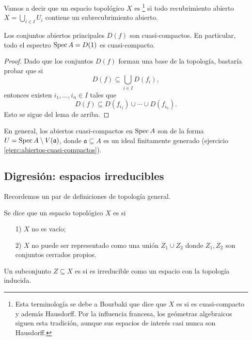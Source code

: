 \documentclass{article}
\numberwithin{equation}{section}
\theoremstyle{definition}
\begin{document}
Vamos a decir que un espacio topológico $X$ es
\footnote{Esta terminología se debe a Bourbaki que dice que
  $X$ es  si es cuasi-compacto y además Hausdorff. Por la
  influencia francesa, los geómetras algebraicos siguen esta tradición, aunque
  sus espacios de interés casi nunca son Hausdorff.} si todo recubrimiento
abierto $X = \bigcup_{i \in I} U_i$ contiene un subrecubrimiento abierto.

\begin{proposicion}
  \label{prof:Df-cuasi-compacto}
  Los conjuntos abiertos principales $D (f)$ son cuasi-compactos. En particular,
  todo el espectro $\operatorname{Spec} A = D (1)$ es cuasi-compacto.

  \begin{proof}
    Dado que los conjuntos $D (f)$ forman una base de la topología, bastaría
    probar que si
    $$D (f) \subseteq \bigcup_{i\in I} D (f_i),$$
    entonces existen $i_1,\ldots,i_n\in I$ tales que
    $$D (f) \subseteq D (f_{i_1}) \cup \cdots \cup D (f_{i_n}).$$
    Esto se sigue del lema de arriba.
  \end{proof}
\end{proposicion}

En general, los abiertos cuasi-compactos en $\operatorname{Spec} A$ son de la forma
$U = \operatorname{Spec} A \setminus V (\mathfrak{a})$, donde $\mathfrak{a} \subseteq A$ es un
ideal finitamente generado (ejercicio \ref{ejerc:abiertos-cuasi-compactos}).

\subsection{Digresión: espacios irreducibles}

Recordemos un par de definiciones de topología general.

\begin{definicion}
  Se dice que un espacio topológico $X$ es  si

  \begin{enumerate}
  \item[1)] $X$ no es vacío;

  \item[2)] $X$ no puede ser representado como una unión $Z_1 \cup Z_2$ donde
    $Z_1,Z_2$ son conjuntos cerrados propios.
  \end{enumerate}

  Un subconjunto $Z \subseteq X$ es  si es irreducible como un
  espacio con la topología inducida.
\end{definicion}
\end{document}
